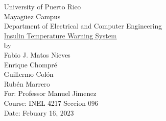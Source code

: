 \begin{titlepage}
  \begin{center}
    \large{University of Puerto Rico\\
    Mayagüez Campus\\
    \vspace{\baselineskip}
    Department of Electrical and Computer Engineering\\}
    \vspace{6cm}
    \Huge{\underline{Insulin Temperature Warning System}\\}
    \vspace{0.5\baselineskip}
    \large by\\
    Fabio J. Matos Nieves\\
    Enrique Chompré\\
    Guillermo Colón\\
    Rubén Marrero\\
    \vspace{3.5cm}
    For: Professor Manuel Jimenez\\
    Course: INEL 4217 Seccion 096\\
    Date: Febuary 16, 2023\\
    \normalsize

  \end{center}
\end{titlepage}
